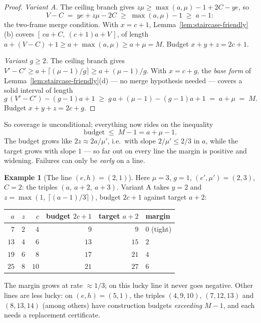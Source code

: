 \documentclass[11pt,reqno]{amsart}
\theoremstyle{plain}
\theoremstyle{definition}
\newtheorem{example}[theorem]{Example}
\theoremstyle{remark}
\begin{document}
\begin{proof}
\emph{Variant A.} The ceiling branch gives $z\mu \ge \max(a,\mu) - 1 + 2C - ye$,
so
\[
  V - C \;=\; ye + z\mu - 2C \;\ge\; \max(a, \mu) - 1 \;\ge\; a - 1 :
\]
the two-frame merge condition. With $x = c + 1$,
Lemma~\ref{lem:staircase-friendly}(b) covers $[\,ca + C,\ (c+1)a + V\,]$, of
length $a + (V - C) + 1 \ge a + \max(a,\mu) \ge a + \mu = M$. Budget $x + y + z =
2c + 1$.

\emph{Variant $g \ge 2$.} The ceiling branch gives $V' - C' \ge a + \lceil (\mu -
1)/g \rceil \ge a + (\mu-1)/g$. With $x = c + g$, the \emph{base form} of
Lemma~\ref{lem:staircase-friendly}(d) --- no merge hypothesis needed --- covers a
solid interval of length
\[
  g\,(V' - C') - (g-1)a + 1 \;\ge\; g\,a + (\mu - 1) - (g-1)a + 1 \;=\; a + \mu
  \;=\; M .
\]
Budget $x + y + z = 2c + g$.
\end{proof}

So coverage is unconditional; everything now rides on the inequality
\[
  \text{budget} \;\le\; M - 1 = a + \mu - 1 .
\]
The budget grows like $2z \approx 2a/\mu'$, i.e.\ with slope $2/\mu' \le 2/3$ in
$a$, while the target grows with slope $1$ --- so far out on every line the
margin is positive and widening. Failures can only be \emph{early} on a line.

\begin{example}[The line $(e, h) = (2, 1)$]\label{ex:caseT-line}
Here $\mu = 3$, $g = 1$, $(e', \mu') = (2, 3)$, $C = 2$: the triples $(a,\ a+2,\
a+3)$. Variant A takes $y = 2$ and $z = \max(1,\ \lceil (a-1)/3 \rceil)$, budget
$2c + 1$ against target $a + 2$:
\begin{center}\small
\begin{tabular}{@{}rrrrrl@{}}
\toprule
$a$ & $z$ & $c$ & budget $2c{+}1$ & target $a{+}2$ & margin \\
\midrule
$7$  & $2$  & $4$  & $9$  & $9$  & $0$ (tight) \\
$13$ & $4$  & $6$  & $13$ & $15$ & $2$ \\
$19$ & $6$  & $8$  & $17$ & $21$ & $4$ \\
$25$ & $8$  & $10$ & $21$ & $27$ & $6$ \\
\bottomrule
\end{tabular}
\end{center}
The margin grows at rate $\approx 1/3$; on this lucky line it never goes
negative. Other lines are less lucky: on $(e,h) = (5,1)$, the triples $(4, 9,
10)$, $(7, 12, 13)$ and $(8, 13, 14)$ (among others) have construction budgets
\emph{exceeding} $M - 1$, and each needs a replacement certificate.
\end{example}
\end{document}
